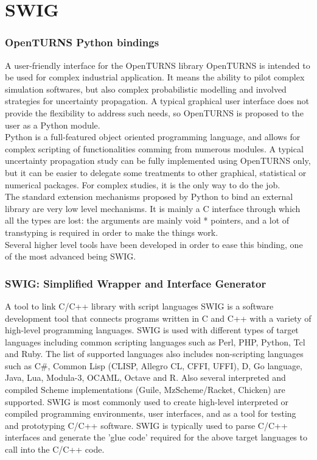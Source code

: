 \documentclass[8pt]{beamer}
\begin{document}
\section[SWIG]{SWIG}
\begin{frame}
  \frametitle{OpenTURNS Python bindings}
  \begin{block}{A user-friendly interface for the OpenTURNS library}
    OpenTURNS is intended to be used for complex industrial application. It means the ability to pilot complex simulation softwares, but also complex probabilistic modelling and involved strategies for uncertainty propagation. A typical graphical user interface does not provide the flexibility to address such needs, so OpenTURNS is proposed to the user as a Python module.\\
    Python is a full-featured object oriented programming language, and allows for complex scripting of functionalities comming from numerous modules. A typical uncertainty propagation study can be fully implemented using OpenTURNS only, but it can be easier to delegate some treatments to other graphical, statistical or numerical packages. For complex studies, it is the only way to do the job.\\
    The standard extension mechanisms proposed by Python to bind an external library are very low level mechanisms. It is mainly a C interface through which all the types are lost: the arguments are mainly {\ttfamily void *} pointers, and a lot of transtyping is required in order to make the things work.\\
    Several higher level tools have been developed in order to ease this binding, one of the most advanced being SWIG.
  \end{block}
\end{frame}

\begin{frame}
  \frametitle{SWIG: Simplified Wrapper and Interface Generator}
  \begin{block}{A tool to link C/C++ library with script languages}
    SWIG is a software development tool that connects programs written in C and C++ with a variety of high-level programming languages. SWIG is used with different types of target languages including common scripting languages such as Perl, PHP, Python, Tcl and Ruby. The list of supported languages also includes non-scripting languages such as C\#, Common Lisp (CLISP, Allegro CL, CFFI, UFFI), D, Go language, Java, Lua, Modula-3, OCAML, Octave and R. Also several interpreted and compiled Scheme implementations (Guile, MzScheme/Racket, Chicken) are supported. SWIG is most commonly used to create high-level interpreted or compiled programming environments, user interfaces, and as a tool for testing and prototyping C/C++ software. SWIG is typically used to parse C/C++ interfaces and generate the 'glue code' required for the above target languages to call into the C/C++ code.
  \end{block}
\end{frame}
\end{document}
